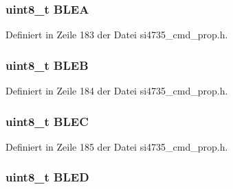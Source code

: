 \subsubsection[{B\+L\+E\+A}]{\setlength{\rightskip}{0pt plus 5cm}uint8\+\_\+t B\+L\+E\+A}\label{unionfm__rds__status__resp12_a22256b3ddf2070027c87504d1de20c2f}


Definiert in Zeile 183 der Datei si4735\+\_\+cmd\+\_\+prop.\+h.

\hypertarget{unionfm__rds__status__resp12_aadd978be8508790bbf25c9a488ea553c}{}
\subsubsection[{B\+L\+E\+B}]{\setlength{\rightskip}{0pt plus 5cm}uint8\+\_\+t B\+L\+E\+B}\label{unionfm__rds__status__resp12_aadd978be8508790bbf25c9a488ea553c}


Definiert in Zeile 184 der Datei si4735\+\_\+cmd\+\_\+prop.\+h.

\hypertarget{unionfm__rds__status__resp12_a279b7213c9f5034e0fa7aa8d9c2bc9a2}{}
\subsubsection[{B\+L\+E\+C}]{\setlength{\rightskip}{0pt plus 5cm}uint8\+\_\+t B\+L\+E\+C}\label{unionfm__rds__status__resp12_a279b7213c9f5034e0fa7aa8d9c2bc9a2}


Definiert in Zeile 185 der Datei si4735\+\_\+cmd\+\_\+prop.\+h.

\hypertarget{unionfm__rds__status__resp12_a3498d51c8fc84119a00242f7bb9b6719}{}
\subsubsection[{B\+L\+E\+D}]{\setlength{\rightskip}{0pt plus 5cm}uint8\+\_\+t B\+L\+E\+D}\label{unionfm__rds__status__resp12_a3498d51c8fc84119a00242f7bb9b6719}


